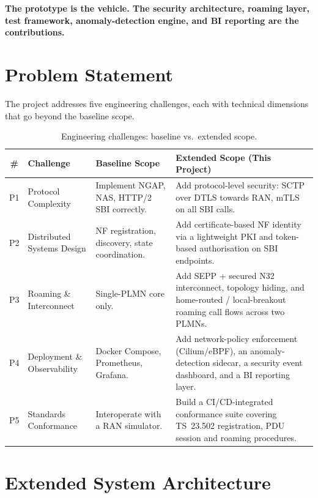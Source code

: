 \documentclass[11pt,a4paper]{report}
\begin{document}
\noindent\textbf{The prototype is the vehicle. The security architecture, roaming layer,
test framework, anomaly-detection engine, and BI reporting are the contributions.}

\section{Problem Statement}
The project addresses five engineering challenges, each with technical dimensions that
go beyond the baseline scope.

\begin{table}[h]
\centering
\footnotesize
\renewcommand{\arraystretch}{1.3}
\begin{tabularx}{\linewidth}{@{}c l X X@{}}
\toprule
\textbf{\#} & \textbf{Challenge} & \textbf{Baseline Scope} & \textbf{Extended Scope (This Project)}\\
\midrule
P1 & Protocol Complexity & Implement NGAP, NAS, HTTP/2 SBI correctly. &
  Add protocol-level security: SCTP over DTLS towards RAN, mTLS on all SBI calls.\\
P2 & Distributed Systems Design & NF registration, discovery, state coordination. &
  Add certificate-based NF identity via a lightweight PKI and token-based authorisation
  on SBI endpoints.\\
P3 & Roaming \& Interconnect & Single-PLMN core only. &
  Add SEPP + secured N32 interconnect, topology hiding, and home-routed / local-breakout
  roaming call flows across two PLMNs.\\
P4 & Deployment \& Observability & Docker Compose, Prometheus, Grafana. &
  Add network-policy enforcement (Cilium/eBPF), an anomaly-detection sidecar, a security
  event dashboard, and a BI reporting layer.\\
P5 & Standards Conformance & Interoperate with a RAN simulator. &
  Build a CI/CD-integrated conformance suite covering TS~23.502 registration, PDU session
  and roaming procedures.\\
\bottomrule
\end{tabularx}
\caption{Engineering challenges: baseline vs.\ extended scope.}
\label{tab:problems}
\end{table}

\section{Extended System Architecture}
\end{document}
